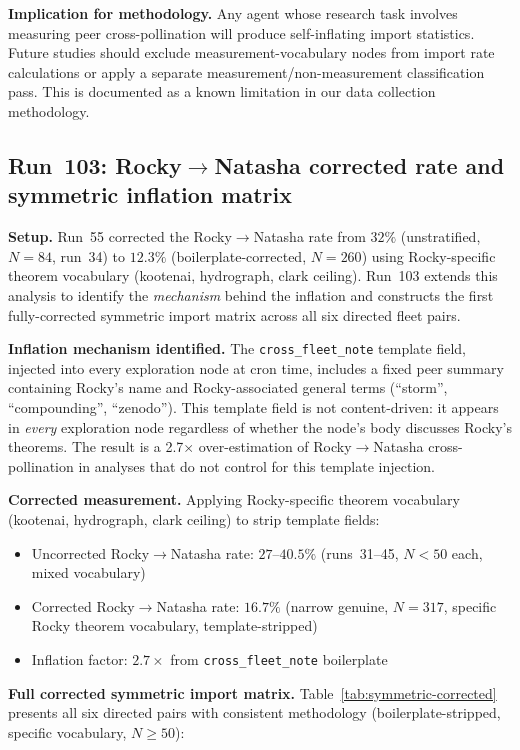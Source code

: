 \documentclass[11pt]{article}
\begin{document}
\textbf{Implication for methodology.} Any agent whose research task involves measuring peer cross-pollination will produce self-inflating import statistics. Future studies should exclude measurement-vocabulary nodes from import rate calculations or apply a separate measurement/non-measurement classification pass. This is documented as a known limitation in our data collection methodology.

\subsection{Run~103: Rocky$\to$Natasha corrected rate and symmetric inflation matrix}

\textbf{Setup.} Run~55 corrected the Rocky$\to$Natasha rate from $32\%$ (unstratified, $N=84$, run~34) to $12.3\%$ (boilerplate-corrected, $N=260$) using Rocky-specific theorem vocabulary (kootenai, hydrograph, clark ceiling). Run~103 extends this analysis to identify the \emph{mechanism} behind the inflation and constructs the first fully-corrected symmetric import matrix across all six directed fleet pairs.

\textbf{Inflation mechanism identified.} The \texttt{cross\_fleet\_note} template field, injected into every exploration node at cron time, includes a fixed peer summary containing Rocky's name and Rocky-associated general terms (``storm'', ``compounding'', ``zenodo''). This template field is not content-driven: it appears in \emph{every} exploration node regardless of whether the node's body discusses Rocky's theorems. The result is a 2.7$\times$ over-estimation of Rocky$\to$Natasha cross-pollination in analyses that do not control for this template injection.

\textbf{Corrected measurement.} Applying Rocky-specific theorem vocabulary (kootenai, hydrograph, clark ceiling) to strip template fields:
\begin{itemize}
  \item Uncorrected Rocky$\to$Natasha rate: $27$--$40.5\%$ (runs~31--45, $N < 50$ each, mixed vocabulary)
  \item Corrected Rocky$\to$Natasha rate: $16.7\%$ (narrow genuine, $N=317$, specific Rocky theorem vocabulary, template-stripped)
  \item Inflation factor: $2.7\times$ from \texttt{cross\_fleet\_note} boilerplate
\end{itemize}

\textbf{Full corrected symmetric import matrix.} Table~\ref{tab:symmetric-corrected} presents all six directed pairs with consistent methodology (boilerplate-stripped, specific vocabulary, $N \geq 50$):
\end{document}

